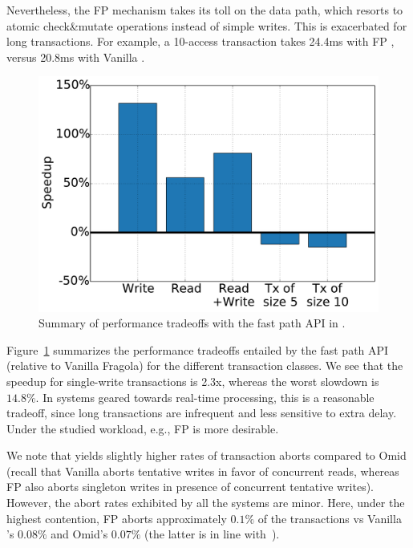 Nevertheless,
the FP mechanism takes its toll on the data path, which resorts to atomic check\&mutate operations 
instead of simple writes. This is exacerbated for long transactions. 
For example, a 10-access transaction takes 24.4ms with FP \sys, 
versus 20.8ms with Vanilla \sys. 

\begin{figure}[h!]
\centering
\includegraphics[width=.48\textwidth]{figs/speedup.pdf}
\caption{Summary of performance tradeoffs with the fast path API in {\sys}.}
\label{fig:fp-tradeoff}
\end{figure}

Figure~\ref{fig:fp-tradeoff} summarizes the performance tradeoffs entailed by the fast path API
(relative to Vanilla Fragola) for the different transaction classes. 
We see that the speedup for single-write transactions is 2.3x, whereas the worst slowdown is $14.8\%$. 
In systems geared towards real-time processing, this is a reasonable tradeoff, since long transactions 
are infrequent and less sensitive to extra delay. Under the studied workload, e.g.,   FP \sys\/ is more desirable. 

We note that \sys\/ yields slightly higher rates of transaction aborts compared to Omid (recall 
that Vanilla \sys\/ aborts tentative writes in favor of concurrent reads, whereas FP \sys\/ also aborts
singleton writes in presence of concurrent tentative writes). However, the abort rates exhibited by all  
the systems are minor. Here, under the highest contention, FP \sys\/ aborts approximately $0.1\%$ 
of the transactions vs Vanilla \sys's $0.08\%$ and Omid's $0.07\%$ (the latter  is in line 
with~\cite{Omid2017}).  

